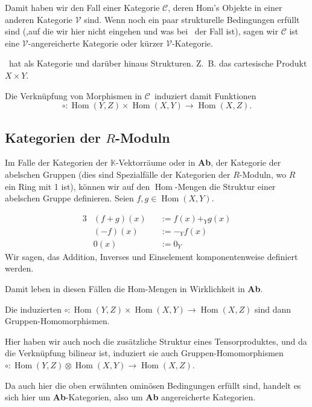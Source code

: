\documentclass[a4paper]{amsart}
\theoremstyle{definition}
\DeclareMathOperator{\Hom}{Hom}
\newcommand{\K}{\ensuremath{\mathbb{ K }}}
\newcommand{\CC}{\ensuremath{\mathcal{ C }}}
\newcommand{\Set}{\text{\textbf{Set}}}
\begin{document}
Damit haben wir den Fall einer Kategorie $\CC$, deren Hom's Objekte in einer anderen Kategorie $\mathcal{V}$ sind. Wenn noch ein paar strukturelle Bedingungen erfüllt sind (,auf die wir hier nicht eingehen und was bei \Set\ der Fall ist), sagen wir $\CC$ ist eine $\mathcal{V}$-angereicherte Kategorie oder kürzer $\mathcal{V}$-Kategorie.

\Set\ hat als Kategorie und darüber hinaus Strukturen. Z.~B. das cartesische Produkt $X \times Y$.

Die Verknüpfung von Morphismen in \CC\ induziert damit Funktionen
\begin{equation}
   \circ \colon \Hom(Y,Z) \times \Hom(X,Y) \to \Hom(X,Z).
\end{equation}

\subsection{Kategorien der $R$-Moduln}
Im Falle der Kategorien der $\K$-Vektorräume oder in \textbf{Ab}, der Kategorie der abelschen Gruppen (dies sind Spezialfälle der Kategorien der $R$-Moduln, wo $R$ ein Ring mit 1 ist), können wir auf den $\Hom$-Mengen die Struktur einer abelschen Gruppe definieren. Seien $f, g \in  \Hom(X,Y)$. 

\begin{alignat}{3}
   &(f+g)(x) &&:= f(x) +_Y g(x)\\
   &(-f)(x) &&:= -_Yf(x)\\
   &0(x) &&:= 0_Y
\end{alignat}
Wir sagen, das Addition, Inverses und Einselement komponentenweise definiert werden.

Damit leben in diesen Fällen die Hom-Mengen in Wirklichkeit in \textbf{Ab}.

Die induzierten $\circ \colon \Hom(Y,Z) \times \Hom(X,Y) \to \Hom(X,Z)$ sind dann Gruppen-Homomorphismen.

Hier haben wir auch noch die zusätzliche Struktur eines Tensorproduktes, und da die Verknüpfung bilinear ist, induziert sie auch Gruppen-Homomorphismen $\circ \colon \Hom(Y,Z) \otimes \Hom(X,Y) \to \Hom(X,Z)$.

Da auch hier die oben erwähnten ominösen Bedingungen erfüllt sind, handelt es sich hier um \textbf{Ab}-Kategorien, also um \textbf{Ab} angereicherte Kategorien.
\end{document}
